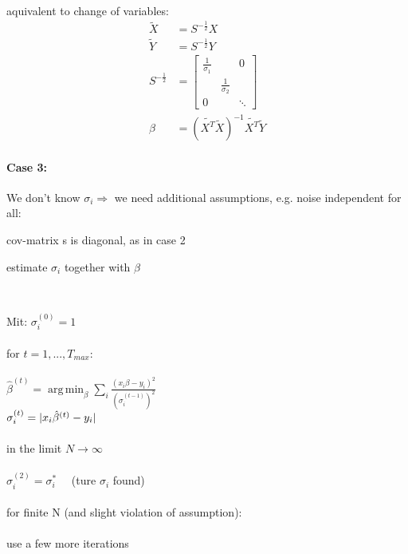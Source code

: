 \documentclass[11pt]{article}
\DeclareMathOperator*{\argmin}{arg\,min}
\DeclarePairedDelimiter\abs{\lvert}{\rvert}
\begin{document}
\begin{itemize}
\begin{equation*}
\begin{align*}
        \end{align*}
      \end{equation*}
      aquivalent to change of variables:
      \begin{equation*}
        \begin{align*}
          \tilde{X} &= S^{-\frac{1}{2}}X \\
          \tilde{Y} &= S^{-\frac{1}{2}}Y \\
          S^{-\frac{1}{2}} &= \left[
          \begin{array}{ccc}
            \frac{1}{\sigma_1} & & 0 \\
            & \frac{1}{\sigma_2} & \\
            0 & & \ddots
          \end{array}
          \right] \\
          \beta &= (\tilde{X^T}\tilde{X})^{-1}\tilde{X^T}\tilde{Y}
        \end{align*}
      \end{equation*}
      \paragraph{Case 3:} We don't know $\sigma_i \Rightarrow$ we need additional
      assumptions, e.g. noise independent for all:
      \begin{arrowlist}
        \item cov-matrix s is diagonal, as in case 2
        \item estimate $\sigma_i$ together with $\beta$
        \item {} \\
        \end{arrowlist}
      Mit: $\sigma_i^{(0)} = 1$ \\ \\
      for $t=1,...,T_{max}$: \\ \\
      \-\hspace{1cm} $\hat{\beta}^{(t)} = \argmin_{\beta} \sum_i
      \frac{(x_i\beta-y_i)^2}{(\sigma_i^{(t-1)})^2}$    \\
      \-\hspace{1cm} $\sigma_i^{(t)} = \abs{x_i\hat{\beta}^{(t)}-y_i}$ \\ \\
      in the limit $N \to \infty$ \\ \\
      \-\hspace{1cm} $\sigma_i^{(2)} = \sigma_i^* \quad$ (ture $\sigma_i$ found) \\ \\
      for finite N (and slight violation of assumption): \\ \\
      \-\hspace{1cm} use a few more iterations

\end{itemize}
\end{document}
